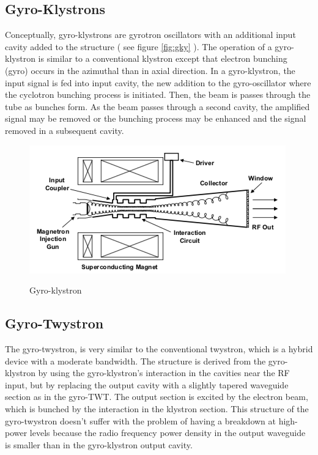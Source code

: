 \subsection{Gyro-Klystrons}
Conceptually, gyro-klystrons are gyrotron oscillators with an additional input cavity added to the structure ( see figure \ref{fig:gky} ). The operation of a gyro-klystron is similar to a conventional klystron except that electron bunching (gyro) occurs in the azimuthal than in axial direction. In a gyro-klystron,  the input signal is fed into input cavity, the new addition to the gyro-oscillator where the cyclotron bunching process is initiated. Then, the beam is passes through the tube as bunches form. As the beam passes through a second cavity, the amplified signal may be removed or the bunching process may be enhanced and the signal removed in a subsequent cavity.

\begin{figure}[H]
\centering
\includegraphics[scale=0.8]{images/gyro_klystron}
\label{ fig:gky }
\caption{Gyro-klystron}
\end{figure}

\subsection{Gyro-Twystron}
The gyro-twystron, is very similar to the conventional twystron, which is a hybrid device with a moderate bandwidth. The structure is derived from the gyro-klystron by using the gyro-klystron's interaction in the cavities near the RF input, but by replacing the output cavity with a slightly tapered waveguide section as in the gyro-TWT. The output section is excited by the electron beam, which is bunched by the interaction in the klystron section. This structure of the gyro-twystron doesn't suffer with the problem of having a breakdown at high-power levels because the radio frequency power density in the output waveguide is smaller than in the gyro-klystron output cavity.

